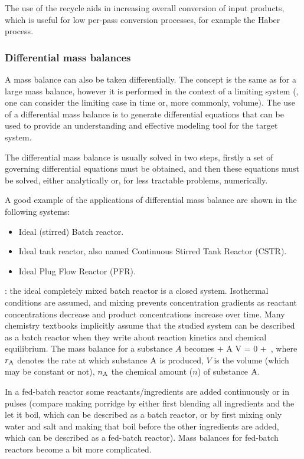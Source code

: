 The use of the recycle aids in increasing overall conversion of input products, which is useful for low per-pass conversion processes, for example the Haber process.


\subsubsection{Differential mass balances}
A mass balance can also be taken differentially. The concept is the same as for a large mass balance, however it is performed in the context of a limiting system (\eg, one can consider the limiting case in time or, more commonly, volume). The use of a differential mass balance is to generate differential equations that can be used to provide an understanding and effective modeling tool for the target system.

The differential mass balance is usually solved in two steps, firstly a set of governing differential equations must be obtained, and then these equations must be solved, either analytically or, for less tractable problems, numerically.

A good example of the applications of differential mass balance are shown in the following systems:
\begin{itemize}
\item Ideal (stirred) Batch reactor.
\item Ideal tank reactor, also named Continuous Stirred Tank Reactor (CSTR).
\item Ideal Plug Flow Reactor (PFR).
\end{itemize}

: the ideal completely mixed batch reactor is a closed system. Isothermal conditions are assumed, and mixing prevents concentration gradients as reactant concentrations decrease and product concentrations increase over time. Many chemistry textbooks implicitly assume that the studied system can be described as a batch reactor when they write about reaction kinetics and chemical equilibrium. The mass balance for a substance $A$ becomes
\beq
{} + \rrate A V = 0 + \,,
\eeq
where $\rrate A$ denotes the rate at which substance $\subs A$ is produced, $V$ is the volume (which may be constant or not), $\amount A$ the chemical amount ($n$) of substance $\subs A$.

In a fed-batch reactor some reactants/ingredients are added continuously or in pulses (compare making porridge by either first blending all ingredients and the let it boil, which can be described as a batch reactor, or by first mixing only water and salt and making that boil before the other ingredients are added, which can be described as a fed-batch reactor). Mass balances for fed-batch reactors become a bit more complicated.


